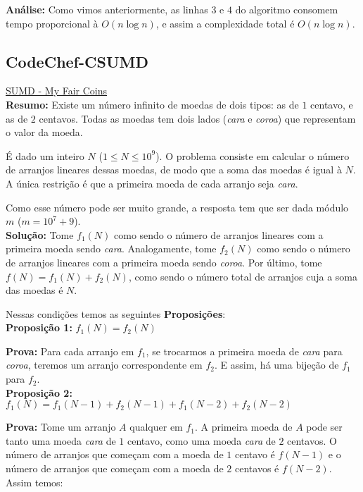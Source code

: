 \textbf{Análise:}
Como vimos anteriormente, as linhas $3$ e $4$ do algoritmo consomem tempo proporcional à $O(n \log n)$, e assim a complexidade total é $O(n \log n)$.




\subsection{CodeChef-CSUMD}
\href{https://www.codechef.com/JULY12/problems/CSUMD}{SUMD - My Fair Coins}\\


\textbf{Resumo:}
Existe um número infinito de moedas de dois tipos: as de $1$ centavo, e as de $2$ centavos. 
Todas as moedas tem dois lados (\textit{cara} e \textit{coroa}) que representam o valor da moeda. 

É dado um inteiro $N$ ($1 \leq N \leq 10^9$). 
O problema consiste em calcular o número de arranjos lineares dessas moedas, de modo que a soma das moedas é igual à $N$.
A única restrição é que a primeira moeda de cada arranjo seja \textit{cara}. 

Como esse número pode ser muito grande, a resposta tem que ser dada módulo $m$ ($m = 10^7+9$).
\\

\textbf{Solução:}
Tome $f_1(N)$ como sendo o número de arranjos lineares com a primeira moeda sendo \textit{cara}. Analogamente, tome $f_2(N)$
como sendo o número de arranjos lineares com a primeira moeda sendo \textit{coroa}. Por último, tome $f(N) = f_1(N)+f_2(N)$, como
sendo o número total de arranjos cuja a soma das moedas é $N$.

Nessas condições temos as seguintes \textbf{Proposições}:
\\

\textbf{Proposição 1:} $f_1(N) = f_2(N)$

\textbf{Prova:} Para cada arranjo em $f_1$, se trocarmos a primeira moeda de \textit{cara} para \textit{coroa}, teremos um arranjo correspondente em $f_2$. E assim, há uma bijeção de $f_1$ para $f_2$.
\\

\textbf{Proposição 2:} $f_1(N) = f_1(N-1) + f_2(N-1) + f_1(N-2) + f_2(N-2)$

\textbf{Prova: }Tome um arranjo $A$ qualquer em $f_1$. A primeira moeda de $A$ pode ser tanto uma moeda \textit{cara} de $1$ centavo,
como uma moeda \textit{cara} de $2$ centavos. O número de arranjos que começam com a moeda de $1$ centavo é $f(N-1)$ e o número de arranjos que começam com a moeda de $2$ centavos é $f(N-2)$. Assim temos:

